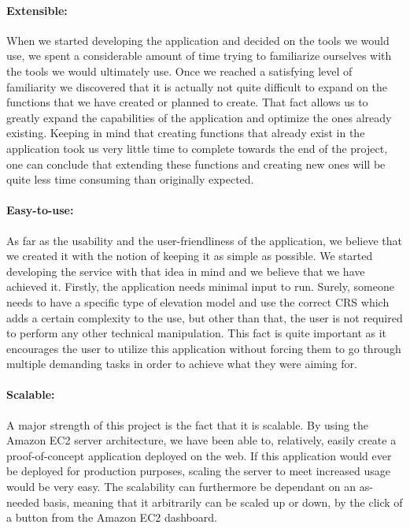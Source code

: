 \paragraph{Extensible:} When we started developing the application and decided on the tools we would use, we spent a considerable  amount of time trying to familiarize ourselves with the tools we would ultimately use. Once we reached a satisfying level of familiarity we discovered that it is actually not quite difficult to expand on the functions that we have created or planned to create. That fact allows us to greatly expand the capabilities of the application and optimize the ones already existing. Keeping in mind that creating functions that already exist in the application took us very little time to complete towards the end of the project, one can conclude that extending these functions and creating new ones will be quite less time consuming than originally expected.

\paragraph{Easy-to-use:} As far as the usability and the user-friendliness of the application, we believe that we created it with the notion of keeping it as simple as possible. We started developing the service with that idea in mind and we believe that we have achieved it. Firstly, the application needs minimal input to run. Surely, someone needs to have a specific type of elevation model and use the correct CRS which adds a certain complexity to the use, but other than that, the user is not required to perform any other technical manipulation. This fact is quite important as it encourages the user to utilize this application without forcing them to go through multiple demanding tasks in order to achieve what they were aiming for.

\paragraph{Scalable:} A major strength of this project is the fact that it is scalable. By using the Amazon EC2 server architecture, we have been able to, relatively, easily create a proof-of-concept application deployed on the web. If this application would ever be deployed for production purposes, scaling the server to meet increased usage would be very easy. The scalability can furthermore be dependant on an as-needed basis, meaning that it arbitrarily can be scaled up or down, by the click of a button from the Amazon EC2 dashboard.

